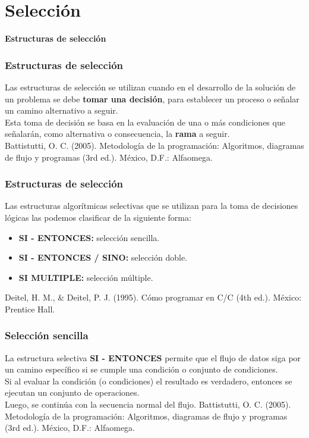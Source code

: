 \section{Selección}

\begin{frame}[c] 
\centering
\huge \textbf{Estructuras de selección}
\end{frame}


\begin{frame}[c]\frametitle{Estructuras de selección}
    Las estructuras de selección se utilizan cuando en el desarrollo de la solución de un problema se debe \textbf{tomar una decisión}, para establecer un proceso o señalar un camino alternativo a seguir.\\
    \vspace*{2mm}
    Esta toma de decisión se basa en la evaluación de una o más condiciones que señalarán, como alternativa o consecuencia, la \textbf{rama} a seguir.\\
    \vspace*{35mm}
    \tiny Battistutti, O. C. (2005). Metodología de la programación: Algoritmos, diagramas de flujo y programas (3rd ed.). México, D.F.: Alfaomega.
\end{frame}


\begin{frame}[c] \frametitle{Estructuras de selección}
Las estructuras algorítmicas selectivas que se utilizan para la toma de decisiones lógicas las podemos clasificar de la siguiente forma:
\begin{itemize}
    \item \textbf{SI - ENTONCES:} selección sencilla.
    \item \textbf{SI - ENTONCES / SINO:} selección doble.
    \item \textbf{SI MULTIPLE:} selección múltiple.
\end{itemize}
\vspace*{40mm}
\tiny Deitel, H. M., & Deitel, P. J. (1995). Cómo programar en C/C (4th ed.). México: Prentice Hall.
\end{frame}


\begin{frame}[c] \frametitle{Selección sencilla}
La estructura selectiva \textbf{SI - ENTONCES} permite que el flujo de datos siga por un camino específico si se cumple una condición o conjunto de condiciones. \\
\vspace*{2mm}
Si al evaluar la condición (o condiciones) el resultado es verdadero, entonces se ejecutan un conjunto de operaciones. \\
\vspace*{2mm}
Luego, se continúa con la secuencia normal del flujo.
\vspace*{35mm}
\tiny Battistutti, O. C. (2005). Metodología de la programación: Algoritmos, diagramas de flujo y programas (3rd ed.). México, D.F.: Alfaomega.
\end{frame}


